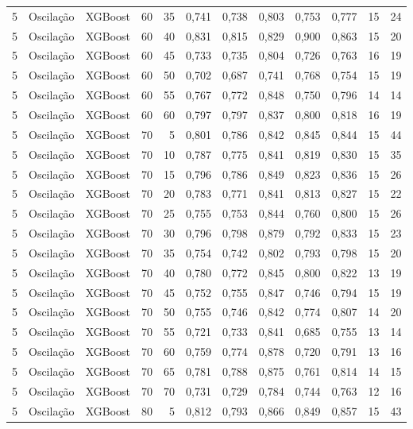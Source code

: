 \begin{longtable}{ccclrrrrrrrr}
5 & Oscilação & XGBoost & 60 & 35 & 0,741 & 0,738 & 0,803 & 0,753 & 0,777 & 15 & 24 \\
5 & Oscilação & XGBoost & 60 & 40 & 0,831 & 0,815 & 0,829 & 0,900 & 0,863 & 15 & 20 \\
5 & Oscilação & XGBoost & 60 & 45 & 0,733 & 0,735 & 0,804 & 0,726 & 0,763 & 16 & 19 \\
5 & Oscilação & XGBoost & 60 & 50 & 0,702 & 0,687 & 0,741 & 0,768 & 0,754 & 15 & 19 \\
5 & Oscilação & XGBoost & 60 & 55 & 0,767 & 0,772 & 0,848 & 0,750 & 0,796 & 14 & 14 \\
5 & Oscilação & XGBoost & 60 & 60 & 0,797 & 0,797 & 0,837 & 0,800 & 0,818 & 16 & 19 \\
5 & Oscilação & XGBoost & 70 & 5 & 0,801 & 0,786 & 0,842 & 0,845 & 0,844 & 15 & 44 \\
5 & Oscilação & XGBoost & 70 & 10 & 0,787 & 0,775 & 0,841 & 0,819 & 0,830 & 15 & 35 \\
5 & Oscilação & XGBoost & 70 & 15 & 0,796 & 0,786 & 0,849 & 0,823 & 0,836 & 15 & 26 \\
5 & Oscilação & XGBoost & 70 & 20 & 0,783 & 0,771 & 0,841 & 0,813 & 0,827 & 15 & 22 \\
5 & Oscilação & XGBoost & 70 & 25 & 0,755 & 0,753 & 0,844 & 0,760 & 0,800 & 15 & 26 \\
5 & Oscilação & XGBoost & 70 & 30 & 0,796 & 0,798 & 0,879 & 0,792 & 0,833 & 15 & 23 \\
5 & Oscilação & XGBoost & 70 & 35 & 0,754 & 0,742 & 0,802 & 0,793 & 0,798 & 15 & 20 \\
5 & Oscilação & XGBoost & 70 & 40 & 0,780 & 0,772 & 0,845 & 0,800 & 0,822 & 13 & 19 \\
5 & Oscilação & XGBoost & 70 & 45 & 0,752 & 0,755 & 0,847 & 0,746 & 0,794 & 15 & 19 \\
5 & Oscilação & XGBoost & 70 & 50 & 0,755 & 0,746 & 0,842 & 0,774 & 0,807 & 14 & 20 \\
5 & Oscilação & XGBoost & 70 & 55 & 0,721 & 0,733 & 0,841 & 0,685 & 0,755 & 13 & 14 \\
5 & Oscilação & XGBoost & 70 & 60 & 0,759 & 0,774 & 0,878 & 0,720 & 0,791 & 13 & 16 \\
5 & Oscilação & XGBoost & 70 & 65 & 0,781 & 0,788 & 0,875 & 0,761 & 0,814 & 14 & 15 \\
5 & Oscilação & XGBoost & 70 & 70 & 0,731 & 0,729 & 0,784 & 0,744 & 0,763 & 12 & 16 \\
5 & Oscilação & XGBoost & 80 & 5 & 0,812 & 0,793 & 0,866 & 0,849 & 0,857 & 15 & 43 \\

\end{longtable}
